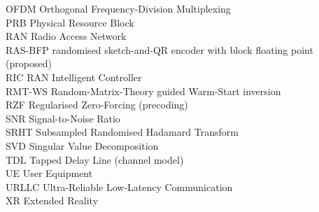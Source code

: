 \documentclass[12pt,a4paper,oneside]{report}
\theoremstyle{definition}
\begin{document}
\begin{tabbing}
OFDM \> Orthogonal Frequency-Division Multiplexing\\
PRB \> Physical Resource Block\\
RAN \> Radio Access Network\\
RAS-BFP \> randomised sketch-and-QR encoder with block floating point (proposed)\\
RIC \> RAN Intelligent Controller\\
RMT-WS \> Random-Matrix-Theory guided Warm-Start inversion\\
RZF \> Regularised Zero-Forcing (precoding)\\
SNR \> Signal-to-Noise Ratio\\
SRHT \> Subsampled Randomised Hadamard Transform\\
SVD \> Singular Value Decomposition\\
TDL \> Tapped Delay Line (channel model)\\
UE \> User Equipment\\
URLLC \> Ultra-Reliable Low-Latency Communication\\
XR \> Extended Reality
\end{tabbing}

\end{document}
